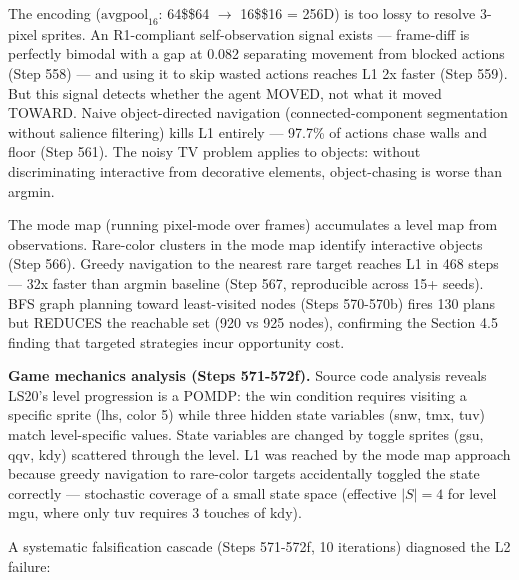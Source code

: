 \documentclass[
  11pt,
]{article}
\begin{document}
The encoding (\(\text{avgpool}_{16}\): 64\$\times\$64 \(\to\)
16\$\times\$16 = 256D) is too lossy to resolve 3-pixel sprites. An
R1-compliant self-observation signal exists --- frame-diff is perfectly
bimodal with a gap at 0.082 separating movement from blocked actions
(Step 558) --- and using it to skip wasted actions reaches L1 2x faster
(Step 559). But this signal detects whether the agent MOVED, not what it
moved TOWARD. Naive object-directed navigation (connected-component
segmentation without salience filtering) kills L1 entirely --- 97.7\% of
actions chase walls and floor (Step 561). The noisy TV problem applies
to objects: without discriminating interactive from decorative elements,
object-chasing is worse than argmin.

The mode map (running pixel-mode over frames) accumulates a level map
from observations. Rare-color clusters in the mode map identify
interactive objects (Step 566). Greedy navigation to the nearest rare
target reaches L1 in 468 steps --- 32x faster than argmin baseline (Step
567, reproducible across 15+ seeds). BFS graph planning toward
least-visited nodes (Steps 570-570b) fires 130 plans but REDUCES the
reachable set (920 vs 925 nodes), confirming the Section 4.5 finding
that targeted strategies incur opportunity cost.

\textbf{Game mechanics analysis (Steps 571-572f).} Source code analysis
reveals LS20's level progression is a POMDP: the win condition requires
visiting a specific sprite (lhs, color 5) while three hidden state
variables (snw, tmx, tuv) match level-specific values. State variables
are changed by toggle sprites (gsu, qqv, kdy) scattered through the
level. L1 was reached by the mode map approach because greedy navigation
to rare-color targets accidentally toggled the state correctly ---
stochastic coverage of a small state space (effective \(|S| = 4\) for
level mgu, where only tuv requires 3 touches of kdy).

A systematic falsification cascade (Steps 571-572f, 10 iterations)
diagnosed the L2 failure:
\end{document}
